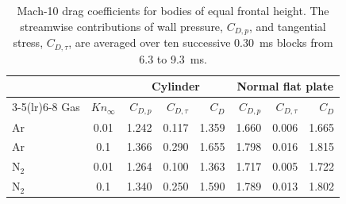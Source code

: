 \begin{table}
\centering\small
\begin{tabular}{lcrrrrrr}
\toprule
 & & \multicolumn{3}{c}{Cylinder} & \multicolumn{3}{c}{Normal flat plate}\\
\cmidrule(lr){3-5}\cmidrule(lr){6-8}
Gas & \(Kn_\infty\) & \(C_{D,p}\) & \(C_{D,\tau}\) & \(C_D\) & \(C_{D,p}\) & \(C_{D,\tau}\) & \(C_D\)\\
\midrule
Ar & 0.01 & 1.242 & 0.117 & 1.359 & 1.660 & 0.006 & 1.665\\
Ar & 0.1 & 1.366 & 0.290 & 1.655 & 1.798 & 0.016 & 1.815\\
\(\mathrm{N}_2\) & 0.01 & 1.264 & 0.100 & 1.363 & 1.717 & 0.005 & 1.722\\
\(\mathrm{N}_2\) & 0.1 & 1.340 & 0.250 & 1.590 & 1.789 & 0.013 & 1.802\\
\bottomrule
\end{tabular}
\caption{Mach-10 drag coefficients for bodies of equal frontal height.
The streamwise contributions of wall pressure, \(C_{D,p}\), and tangential
stress, \(C_{D,\tau}\), are averaged over ten successive 0.30~ms blocks
from 6.3 to 9.3~ms.}\label{tab:matched_drag}
\end{table}

